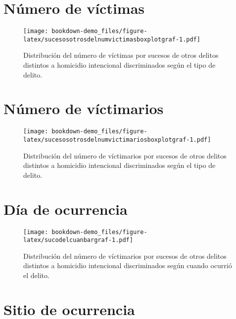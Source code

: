 \documentclass[
]{book}
\begin{document}
\hypertarget{nuxfamero-de-vuxedctimas}{%
\section{Número de víctimas}\label{nuxfamero-de-vuxedctimas}}



\begin{figure}
\centering
\texttt{[image: bookdown-demo\_files/figure-latex/sucesosotrosdelnumvictimasboxplotgraf-1.pdf]}
\caption{\label{fig:sucesosotrosdelnumvictimasboxplotgraf}Distribución del número de víctimas por sucesos de otros delitos distintos a homicidio intencional discriminados según el tipo de delito.}
\end{figure}

\hypertarget{nuxfamero-de-vuxedctimarios}{%
\section{Número de víctimarios}\label{nuxfamero-de-vuxedctimarios}}



\begin{figure}
\centering
\texttt{[image: bookdown-demo\_files/figure-latex/sucesosotrosdelnumvictimariosboxplotgraf-1.pdf]}
\caption{\label{fig:sucesosotrosdelnumvictimariosboxplotgraf}Distribución del número de víctimarios por sucesos de otros delitos distintos a homicidio intencional discriminados según el tipo de delito.}
\end{figure}

\hypertarget{duxeda-de-ocurrencia-1}{%
\section{Día de ocurrencia}\label{duxeda-de-ocurrencia-1}}



\begin{figure}
\centering
\texttt{[image: bookdown-demo\_files/figure-latex/sucodelcuanbargraf-1.pdf]}
\caption{\label{fig:sucodelcuanbargraf}Distribución del número de víctimarios por sucesos de otros delitos distintos a homicidio intencional discriminados según cuando ocurrió el delito.}
\end{figure}

\hypertarget{sitio-de-ocurrencia-1}{%
\section{Sitio de ocurrencia}\label{sitio-de-ocurrencia-1}}
\end{document}
